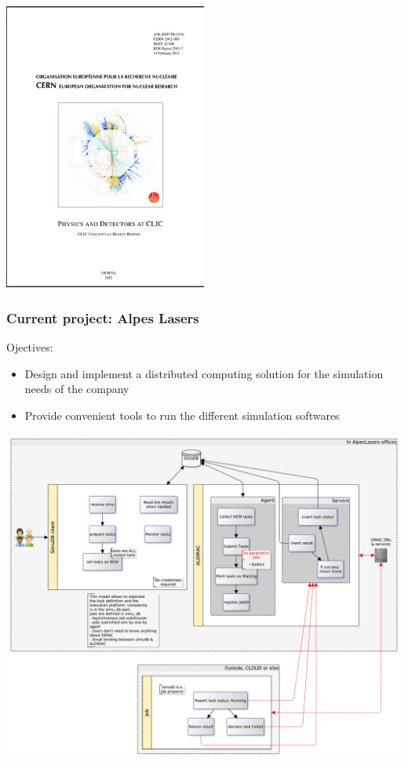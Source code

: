 \documentclass[14pt]{beamer}
\begin{document}
\begin{frame}
\centering
\includegraphics[width=0.5\textwidth]{CLICDR}

\end{frame}

\begin{frame}
\frametitle{Current project: Alpes Lasers}
Ojectives:
\begin{itemize}
\item Design and implement a distributed computing solution for the simulation needs of the company
\item Provide convenient tools to run the different simulation softwares
\end{itemize}
\end{frame}

\begin{frame}
\centering
\includegraphics[width=\textwidth]{Architecture1}

\end{frame}
\end{document}
